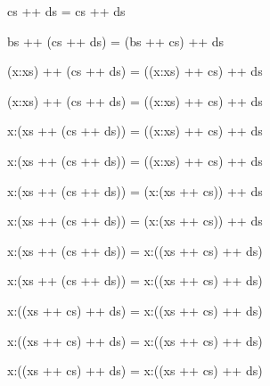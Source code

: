 \documentclass{beamer}
\newcommand{\ca}[1]{{\color{blue}#1}}
\newcommand{\cb}[1]{{\color{violet}#1}}
\newcommand{\cc}[1]{{\color{red}#1}}
\begin{document}
\begin{frame}[t,fragile]
\begin{center}
\begin{overprint}
\begin{semiverbatim}
       \alert<14>{cs ++ ds}  =  \alert<14>{cs        ++ ds}
\end{semiverbatim}

\begin{semiverbatim}
    \alert<18>{bs} ++ (cs ++ ds) =     (\alert<18>{bs} ++ cs) ++ ds
\end{semiverbatim}

\begin{semiverbatim}
(x:xs) ++ (cs ++ ds) = ((x:xs) ++ cs) ++ ds
\end{semiverbatim}

\begin{semiverbatim}
(\ca{x}:\cb{xs}) ++ \cc{(cs ++ ds)} = ((x:xs) ++ cs) ++ ds
\end{semiverbatim}

\begin{semiverbatim}
\ca{x}:(\cb{xs} ++ \cc{(cs ++ ds)}) = ((x:xs) ++ cs) ++ ds
\end{semiverbatim}

\begin{semiverbatim}
x:(xs ++ (cs ++ ds)) = ((\ca{x}:\cb{xs}) ++ \cc{cs}) ++ ds
\end{semiverbatim}

\begin{semiverbatim}
x:(xs ++ (cs ++ ds)) = (\ca{x}:(\cb{xs} ++ \cc{cs})) ++ ds
\end{semiverbatim}

\begin{semiverbatim}
x:(xs ++ (cs ++ ds)) = (\ca{x}:\cb{(xs ++ cs)}) ++ \cc{ds}
\end{semiverbatim}

\begin{semiverbatim}
x:(xs ++ (cs ++ ds)) = \ca{x}:(\cb{(xs ++ cs)} ++ \cc{ds})
\end{semiverbatim}

\begin{semiverbatim}
x:(\alert{xs ++ (cs ++ ds)}) = x:((xs ++ cs) ++ ds)
\end{semiverbatim}

\begin{semiverbatim}
x:(\alert{(xs ++ cs) ++ ds)} = x:((xs ++ cs) ++ ds)
\end{semiverbatim}

\begin{semiverbatim}
\alert{x:((xs ++ cs) ++ ds)} = \alert{x:((xs ++ cs) ++ ds)}
\end{semiverbatim}

\begin{semiverbatim}
x:((xs ++ cs) ++ ds) = x:((xs ++ cs) ++ ds)
\end{semiverbatim}

\end{overprint}
\end{center}

\end{frame}
\end{document}
